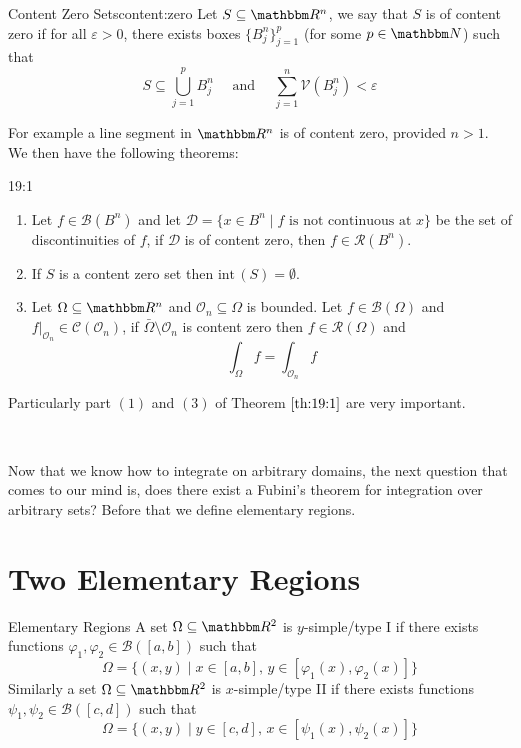 \documentclass[../Analysis-3.tex]{subfiles}
\begin{document}
\begin{Def}{Content Zero Sets}{content:zero}
  Let $S \subseteq \R^n$, we say that $S$ is of content zero if for all $\varepsilon > 0$, there exists boxes $\{ B_j^n \}_{j=1}^p$ (for some $p \in \N$) such that
  \[
    S \subseteq \bigcup_{j=1}^p B_j^n \quad \mbox{ and } \quad \sum_{j=1}^n \mathcal{V}(B^n_j) < \varepsilon
  \]
\end{Def}

For example a line segment in $\R^n$ is of content zero, provided $n > 1$. We then have the following theorems:

\begin{Thm}{}{19:1}
  \begin{enumerate}
    \item Let $f \in \mathscr{B}(B^n)$ and let $\mathcal{D} = \{ x \in B^n \mid f \mbox{ is not continuous at } x \}$ be the set of discontinuities of $f$, if $\mathcal{D}$ is of content zero, then $f \in \mathscr{R}(B^n)$.

    \item If $S$ is a content zero set then $\mathrm{int}\,(S) = \emptyset$.

    \item Let $\Omega \subseteq \R^n$ and $\mathcal{O}_n \subseteq \Omega$ is bounded. Let $f \in \mathscr{B}(\Omega)$ and $f\vert_{\mathcal{O}_n} \in \mathscr{C}(\mathcal{O}_n)$, if $\bar{\Omega}\setminus \mathcal{O}_n$ is content zero then $f \in \mathscr{R}(\Omega)$ and
          \[
            \int_{\Omega} f = \int_{\mathcal{O}_n} f
          \]
  \end{enumerate}
\end{Thm}
Particularly part $(1)$ and $(3)$ of Theorem $\ref{th:19:1}$ are very important.

\

Now that we know how to integrate on arbitrary domains, the next question that comes to our mind is, does there exist a Fubini's theorem for integration over arbitrary sets? Before that we define elementary regions.

\section{Two Elementary Regions}

\begin{Def}{Elementary Regions}{}
  A set $\Omega \subseteq \R^2$ is $y$-simple/type I if there exists functions $\varphi_1, \varphi_2 \in \mathscr{B}([a,b])$ such that
  \[
    \Omega = \{ (x,y) \mid x \in [a,b], \, y \in [\varphi_1(x), \varphi_2(x)] \}
  \]
  Similarly a set $\Omega \subseteq \R^2$ is $x$-simple/type II if there exists functions $\psi_1, \psi_2 \in \mathscr{B}([c,d])$ such that
  \[
    \Omega = \{ (x,y) \mid y \in [c,d], \, x \in [ \psi_1(x), \psi_2(x) ] \}
  \]
\end{Def}
\end{document}

